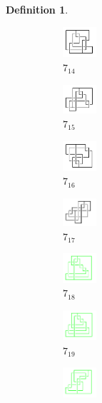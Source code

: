 \documentclass{article}
\theoremstyle{definition}
\newtheorem{defn}[thm]{Definition}
\theoremstyle{theorem}
\theoremstyle{proposition}
\theoremstyle{corollary}
\begin{document}
\begin{defn}
\begin{figure}[H]
\begin{subfigure}{0.075\textwidth}
    \includegraphics[width=1.25cm]{../Midterm_Poster/grid_diagram/handcuff_7_14.png}
    \caption{$7_{14}$} 
    \end{subfigure}
    \begin{subfigure}{0.075\textwidth}
    \includegraphics[width=1.25cm]{../Midterm_Poster/grid_diagram/handcuff_7_15.png}
    \caption{$7_{15}$} 
    \end{subfigure}
    \begin{subfigure}{0.075\textwidth}
    \includegraphics[width=1.25cm]{../Midterm_Poster/grid_diagram/handcuff_7_16.png}
    \caption{$7_{16}$} 
    \end{subfigure}
    \begin{subfigure}{0.075\textwidth}
    \includegraphics[width=1.25cm]{../Midterm_Poster/grid_diagram/handcuff_7_17.png}
    \caption{$7_{17}$} 
    \end{subfigure}
    \begin{subfigure}{0.075\textwidth}
    \includegraphics[width=1.25cm]{../Midterm_Poster/grid_diagram/handcuff_7_18.png}
    \caption{$7_{18}$} 
    \end{subfigure}
    \begin{subfigure}{0.075\textwidth}
    \includegraphics[width=1.25cm]{../Midterm_Poster/grid_diagram/handcuff_7_19.png}
    \caption{$7_{19}$} 
    \end{subfigure}
    \begin{subfigure}{0.075\textwidth}
    \includegraphics[width=1.25cm]{../Midterm_Poster/grid_diagram/handcuff_7_20.png}

\end{subfigure}
\end{figure}
\end{defn}
\end{document}
